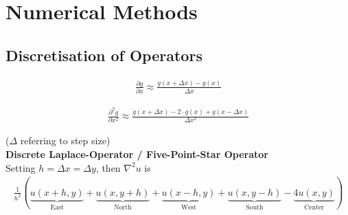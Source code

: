\section{Numerical Methods}
\subsection{Discretisation of Operators}

\begin{align*}
	\frac{\partial g}{\partial x}
	\approx
	\frac{g(x + \Delta x) - g(x)}{\Delta x}
\end{align*}

\begin{align*}
	\frac{\partial^2 g}{\partial x^2}
	\approx
	\frac{g(x + \Delta x) - 2\cdot g(x) + g(x - \Delta x)}{\Delta x^2}
\end{align*}

($\Delta$ referring to step size)
\\[1em]
\textbf{Discrete Laplace-Operator / Five-Point-Star Operator}
\\
Setting $h = \Delta x = \Delta y$, then $\nabla^2u$ is
\begin{align*}
	\frac{1}{h^{2}}\left(
	\underbrace{u(x+h,y)}_{\text{East}}
	+ \underbrace{u(x,y+h)}_{\text{North}}
	+ \underbrace{u(x-h,y)}_{\text{West}}
	+ \underbrace{u(x,y-h)}_{\text{South}}
	- \underbrace{4u(x,y)}_\text{Center}
	\right)
\end{align*}
